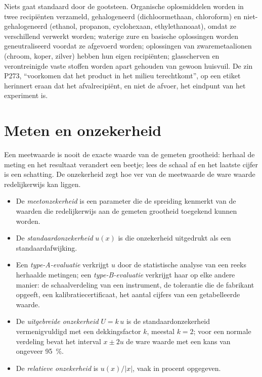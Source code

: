 \begin{inthelab}[Afval]
Niets gaat standaard door de gootsteen. Organische oplosmiddelen worden
in twee recipiënten verzameld, gehalogeneerd (dichloormethaan,
chloroform) en niet-gehalogeneerd (ethanol, propanon, cyclohexaan,
ethylethanoaat), omdat ze verschillend verwerkt worden; waterige zure en
basische oplossingen worden geneutraliseerd voordat ze afgevoerd worden;
oplossingen van zwaremetaalionen (chroom, koper, zilver) hebben hun eigen
recipiënten; glasscherven en verontreinigde vaste stoffen worden apart
gehouden van gewoon huisvuil. De zin P273, ``voorkomen dat het product in
het milieu terechtkomt'', op een etiket herinnert eraan dat het
afvalrecipiënt, en niet de afvoer, het eindpunt van het experiment is.
\end{inthelab}

\section{Meten en onzekerheid}

Een meetwaarde is nooit de exacte waarde van de gemeten grootheid: herhaal
de meting en het resultaat verandert een beetje; lees de schaal af en het
laatste cijfer is een schatting. De onzekerheid zegt hoe ver van de
meetwaarde de ware waarde redelijkerwijs kan liggen.

\begin{definition}[Meetonzekerheid]\label{def:b1:lab-techniques-1:uncertainty}
\begin{itemize}
  \item De \emph{meetonzekerheid} is een parameter
        die de spreiding kenmerkt van de waarden die redelijkerwijs aan de
        gemeten grootheid toegekend kunnen worden.
  \item De \emph{standaardonzekerheid} $u(x)$
        is die onzekerheid uitgedrukt als een standaardafwijking.
  \item Een \emph{type-A-evaluatie} verkrijgt $u$
        door de statistische analyse van een reeks herhaalde metingen; een
        \emph{type-B-evaluatie} verkrijgt haar op
        elke andere manier: de schaalverdeling van een instrument, de
        tolerantie die de fabrikant opgeeft, een kalibratiecertificaat,
        het aantal cijfers van een getabelleerde waarde.
  \item De \emph{uitgebreide onzekerheid}
        $U = k\,u$ is de standaardonzekerheid vermenigvuldigd met een
        dekkingsfactor $k$, meestal $k = 2$; voor een normale verdeling
        bevat het interval $x \pm 2u$ de ware waarde met een kans van
        ongeveer \qty{95}{\percent}.
  \item De \emph{relatieve onzekerheid} is
        $u(x)/|x|$, vaak in procent opgegeven.
\end{itemize}
\end{definition}

